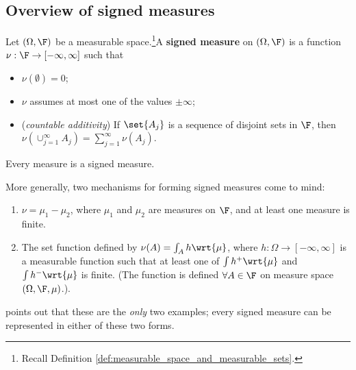 \documentclass{article} %
\newcommand{\dmu}{\wrt{\mu}}
\begin{document}
\subsection{Overview of signed measures}



\begin{definition} Let $(\Omega,\F)$ be a measurable space.\footnote{Recall Definition \ref{def:measurable_space_and_measurable_sets}.}A \textbf{signed measure} on $(\Omega,\F)$ is a function $\nu : \F \to [-\infty, \infty]$ such that
\begin{itemize}
\item $\nu(\emptyset) = 0$;
\item $\nu$ assumes at most one of the values $\pm \infty$;
\item (\textit{countable additivity}) If $\set{A_j}$ is a sequence of disjoint sets in $\F$, then $\nu(\cup_{j=1}^\infty A_j) = \sum_{j=1}^\infty \nu(A_j)$.
\end{itemize}
\label{def:signed_measure}
\end{definition}

\begin{remark}
Every measure is a signed measure. 
\end{remark}

More generally, two mechanisms for forming signed measures come to mind:
\begin{enumerate}
\item $\nu = \mu_1 - \mu_2$, where $\mu_1$ and $\mu_2$ are measures on $\F$, and at least one measure is finite.
\item The set function defined by $\nu(A) = \int_A h \dmu$, where $h : \Omega \to [-\infty, \infty]$ is a measurable function such that at least one of $\int h^+ \dmu$ and $\int h^- \dmu$ is finite.  {\tiny (The function is defined $\forall A \in \F$ on measure space $(\Omega, \F, \mu)$.)}.
\end{enumerate}

\begin{remark}
\cite{folland1999real} points out that these are the \textit{only} two examples; every signed measure can be represented in either of these two forms.
\end{remark}
\end{document}
